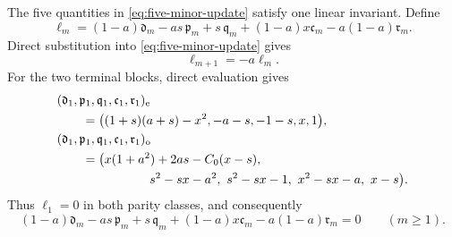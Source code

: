 \documentclass[12pt,anonymous]{iopjournal}
\numberwithin{equation}{section}
\theoremstyle{remark}
\begin{document}
The five quantities in \eqref{eq:five-minor-update} satisfy one linear
invariant.  Define
\[
 \ell_m=(1-a)\mathfrak d_m-as\,\mathfrak p_m+s\,\mathfrak q_m
       +(1-a)x\mathfrak c_m-a(1-a)\mathfrak r_m.
\]
Direct substitution into \eqref{eq:five-minor-update} gives
\[
 \ell_{m+1}=-a\ell_m.
\]
For the two terminal blocks, direct evaluation gives
\[
\begin{aligned}
&(\mathfrak d_1,\mathfrak p_1,\mathfrak q_1,\mathfrak c_1,\mathfrak r_1)_{\mathrm e}\\
&\qquad=\bigl((1+s)(a+s)-x^2,-a-s,-1-s,x,1\bigr),\\
&(\mathfrak d_1,\mathfrak p_1,\mathfrak q_1,\mathfrak c_1,\mathfrak r_1)_{\mathrm o}\\
&\qquad=\bigl(x(1+a^2)+2as-C_0(x-s),\\
&\hspace{26mm}s^2-sx-a^2,\ s^2-sx-1,\ x^2-sx-a,\ x-s\bigr).
\end{aligned}
\]
Thus \(\ell_1=0\) in both parity classes, and consequently
\begin{equation}\label{eq:fold-minor-invariant}
 (1-a)\mathfrak d_m-as\,\mathfrak p_m+s\,\mathfrak q_m
 +(1-a)x\mathfrak c_m-a(1-a)\mathfrak r_m=0
 \qquad(m\geq1).
\end{equation}
\end{document}
